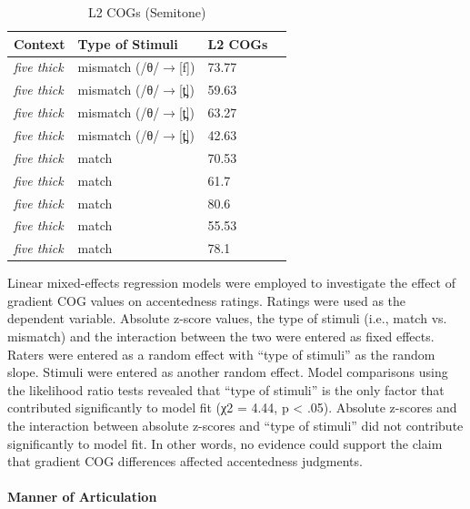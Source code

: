\begin{table}[h]
  \figSpace
  \centering
  \caption{L2 COGs (Semitone)}
    \begin{tabular}{lllr}
    \toprule
   Context & Type of Stimuli & L2 COGs\\
    \midrule
    \textit{five thick} & mismatch (/θ/$\rightarrow$[f]) & 73.77 \\
    \textit{five thick} & mismatch (/θ/$\rightarrow$[t̪]) & 59.63 \\
    \textit{five thick} & mismatch (/θ/$\rightarrow$[t̪]) & 63.27 \\
    \textit{five thick} & mismatch (/θ/$\rightarrow$[t̪]) & 42.63 \\
    \textit{five thick} & match & 70.53 \\
    \textit{five thick} & match & 61.7 \\
    \textit{five thick} & match & 80.6 \\
    \textit{five thick} & match & 55.53 \\
    \textit{five thick} & match & 78.1 \\
    \bottomrule
    \end{tabular}%
  \label{tab:cog2}%
    \figSpace
\end{table}%

Linear mixed-effects regression models were employed to investigate the effect of gradient COG values on accentedness ratings. Ratings were used as the dependent variable. Absolute z-score values, the type of stimuli (i.e., match vs. mismatch) and the interaction between the two were entered as fixed effects. Raters were entered as a random effect with “type of stimuli” as the random slope. Stimuli were entered as another random effect. Model comparisons using the likelihood ratio tests revealed that “type of stimuli” is the only factor that contributed significantly to model fit (χ2 = 4.44, p < .05). Absolute z-scores and the interaction between absolute z-scores and “type of stimuli” did not contribute significantly to model fit. In other words, no evidence could support the claim that gradient COG differences affected accentedness judgments. 

\paragraph{Manner of Articulation}

